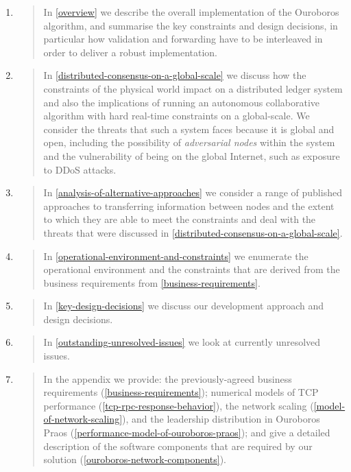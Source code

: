 \documentclass[11pt,a4paper]{article}
\begin{document}
\begin{enumerate}
\def\labelenumi{\arabic{enumi}.}
\item
  \begin{quote}
  In \cref{overview} we describe the overall
  implementation of the Ouroboros algorithm, and summarise the key
  constraints and design decisions, in particular how validation and
  forwarding have to be interleaved in order to deliver a robust
  implementation.
  \end{quote}
\item
  \begin{quote}
  In \cref{distributed-consensus-on-a-global-scale} we discuss how the
  constraints of the physical world impact on a distributed ledger
  system and also the implications of running an autonomous
  collaborative algorithm with hard real-time constraints on a
  global-scale. We consider the threats that such a system faces because
  it is global and open, including the possibility of \emph{adversarial
  nodes} within the system and the vulnerability of being on the global
  Internet, such as exposure to DDoS attacks.
  \end{quote}
\item
  \begin{quote}
  In \cref{analysis-of-alternative-approaches} we consider a range of
  published approaches to transferring information between nodes and the
  extent to which they are able to meet the constraints and deal with
  the threats that were discussed in
  \cref{distributed-consensus-on-a-global-scale}.
  \end{quote}
\item
  \begin{quote}
  In \cref{operational-environment-and-constraints} we enumerate the
  operational environment and the constraints that are derived from the
  business requirements from \cref{business-requirements}.
  \end{quote}
\item
  \begin{quote}
  In \cref{key-design-decisions} we discuss our development
  approach and design decisions.
  \end{quote}
\item
  \begin{quote}
  In \cref{outstanding-unresolved-issues} we look at currently
  unresolved issues.
  \end{quote}
\item
  \begin{quote}
  In the appendix we provide: the previously-agreed business
  requirements (\cref{business-requirements}); numerical models of TCP
  performance (\cref{tcp-rpc-response-behavior}), the network scaling
  (\cref{model-of-network-scaling}), and the leadership distribution in
  Ouroboros Praos (\cref{performance-model-of-ouroboros-praos}); and
  give a detailed description of the software components that are
  required by our solution (\cref{ouroboros-network-components}).
  \end{quote}
\end{enumerate}
\end{document}
